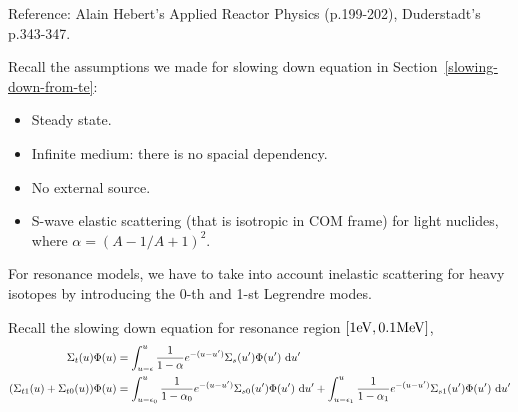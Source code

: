 \documentclass{school-22.211-notes}
\date{February 27, 2012}
\begin{document}
\maketitle



\clearpage
{}

Reference: Alain Hebert's Applied Reactor Physics (p.199-202), Duderstadt's p.343-347. 

Recall the assumptions we made for slowing down equation in Section~\ref{slowing-down-from-te}: 
\begin{itemize}
\item Steady state.
\item Infinite medium: there is no spacial dependency. 
\item No external source. 
\item S-wave elastic scattering (that is isotropic in COM frame) for light nuclides, 
  where $\alpha = (A-1/A+1)^2$.
\end{itemize}

For resonance models, we have to take into account inelastic scattering for heavy isotopes by introducing the 0-th and 1-st Legrendre modes. 


Recall the slowing down equation for resonance region $[1\mathrm{eV}, 0.1 \mathrm{MeV}]$, 
\begin{align}
\Sigma_t (u) \Phi(u) &= \int_{u-\epsilon}^u \frac{1}{1 - \alpha} e^{-(u-u')} \Sigma_s (u') \Phi(u') \mbox{ }\mathrm{d} u' \label{resonance-sl-d-eqn} \\
(\Sigma_{t1}(u) + \Sigma_{t0} (u)) \Phi(u) &= \int_{u - \epsilon_0}^u \frac{1}{1 - \alpha_0} e^{-(u-u')} \Sigma_{s0}(u') \Phi(u') \mbox{ }\mathrm{d} u' + \int_{u-\epsilon_1}^u \frac{1}{1 - \alpha_1} e^{-(u-u')} \Sigma_{s1} (u') \Phi(u') \mbox{ }\mathrm{d} u'  
\end{align}
\end{document}
